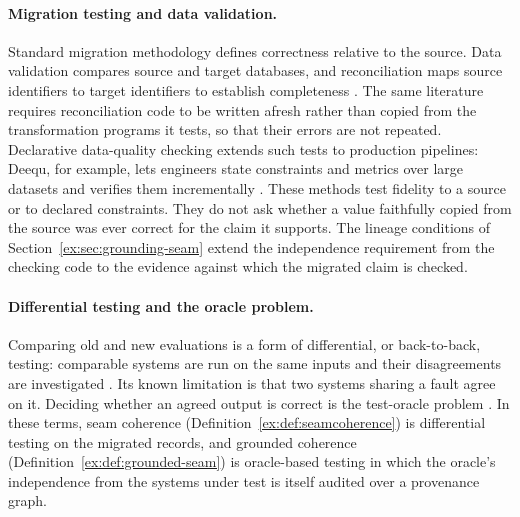 \documentclass[smallextended,envcountsect,envcountsame,natbib]{svjour3}
\begin{document}
\paragraph{Migration testing and data validation.} Standard migration methodology defines correctness relative to the source. Data validation compares source and target databases, and reconciliation maps source identifiers to target identifiers to establish completeness \citep{matthesschulzhaller2011}. The same literature requires reconciliation code to be written afresh rather than copied from the transformation programs it tests, so that their errors are not repeated. Declarative data-quality checking extends such tests to production pipelines: Deequ, for example, lets engineers state constraints and metrics over large datasets and verifies them incrementally \citep{schelter2018}. These methods test fidelity to a source or to declared constraints. They do not ask whether a value faithfully copied from the source was ever correct for the claim it supports. The lineage conditions of Section~\ref{ex:sec:grounding-seam} extend the independence requirement from the checking code to the evidence against which the migrated claim is checked.

\paragraph{Differential testing and the oracle problem.} Comparing old and new evaluations is a form of differential, or back-to-back, testing: comparable systems are run on the same inputs and their disagreements are investigated \citep{mckeeman1998}. Its known limitation is that two systems sharing a fault agree on it. Deciding whether an agreed output is correct is the test-oracle problem \citep{barr2015}. In these terms, seam coherence (Definition~\ref{ex:def:seamcoherence}) is differential testing on the migrated records, and grounded coherence (Definition~\ref{ex:def:grounded-seam}) is oracle-based testing in which the oracle's independence from the systems under test is itself audited over a provenance graph.
\end{document}

